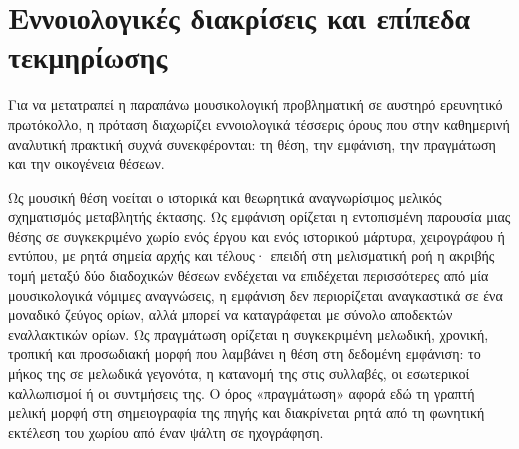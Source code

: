 \documentclass[11pt,a4paper]{article}
\begin{document}
\section{Εννοιολογικές διακρίσεις και επίπεδα τεκμηρίωσης}

Για να μετατραπεί η παραπάνω μουσικολογική προβληματική σε αυστηρό ερευνητικό πρωτόκολλο, η πρόταση διαχωρίζει εννοιολογικά τέσσερις όρους που στην καθημερινή αναλυτική πρακτική συχνά συνεκφέρονται: τη θέση, την εμφάνιση, την πραγμάτωση και την οικογένεια θέσεων.

Ως μουσική θέση νοείται ο ιστορικά και θεωρητικά αναγνωρίσιμος μελικός σχηματισμός μεταβλητής έκτασης. Ως εμφάνιση ορίζεται η εντοπισμένη παρουσία μιας θέσης σε συγκεκριμένο χωρίο ενός έργου και ενός ιστορικού μάρτυρα, χειρογράφου ή εντύπου, με ρητά σημεία αρχής και τέλους· επειδή στη μελισματική ροή η ακριβής τομή μεταξύ δύο διαδοχικών θέσεων ενδέχεται να επιδέχεται περισσότερες από μία μουσικολογικά νόμιμες αναγνώσεις, η εμφάνιση δεν περιορίζεται αναγκαστικά σε ένα μοναδικό ζεύγος ορίων, αλλά μπορεί να καταγράφεται με σύνολο αποδεκτών εναλλακτικών ορίων. Ως πραγμάτωση ορίζεται η συγκεκριμένη μελωδική, χρονική, τροπική και προσωδιακή μορφή που λαμβάνει η θέση στη δεδομένη εμφάνιση: το μήκος της σε μελωδικά γεγονότα, η κατανομή της στις συλλαβές, οι εσωτερικοί καλλωπισμοί ή οι συντμήσεις της. Ο όρος «πραγμάτωση» αφορά εδώ τη γραπτή μελική μορφή στη σημειογραφία της πηγής και διακρίνεται ρητά από τη φωνητική εκτέλεση του χωρίου από έναν ψάλτη σε ηχογράφηση.
\end{document}
